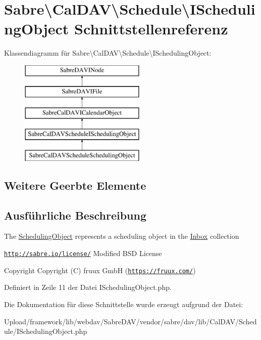 \hypertarget{interface_sabre_1_1_cal_d_a_v_1_1_schedule_1_1_i_scheduling_object}{}\section{Sabre\textbackslash{}Cal\+D\+AV\textbackslash{}Schedule\textbackslash{}I\+Scheduling\+Object Schnittstellenreferenz}
\label{interface_sabre_1_1_cal_d_a_v_1_1_schedule_1_1_i_scheduling_object}
Klassendiagramm für Sabre\textbackslash{}Cal\+D\+AV\textbackslash{}Schedule\textbackslash{}I\+Scheduling\+Object\+:\begin{figure}[H]
\begin{center}
\leavevmode
\includegraphics[height=5.000000cm]{interface_sabre_1_1_cal_d_a_v_1_1_schedule_1_1_i_scheduling_object}
\end{center}
\end{figure}
\subsection*{Weitere Geerbte Elemente}


\subsection{Ausführliche Beschreibung}
The \mbox{\hyperlink{class_sabre_1_1_cal_d_a_v_1_1_schedule_1_1_scheduling_object}{Scheduling\+Object}} represents a scheduling object in the \mbox{\hyperlink{class_sabre_1_1_cal_d_a_v_1_1_schedule_1_1_inbox}{Inbox}} collection

\href{http://sabre.io/license/}{\tt http\+://sabre.\+io/license/} Modified B\+SD License \begin{DoxyCopyright}{Copyright}
Copyright (C) fruux GmbH (\href{https://fruux.com/}{\tt https\+://fruux.\+com/}) 
\end{DoxyCopyright}


Definiert in Zeile 11 der Datei I\+Scheduling\+Object.\+php.



Die Dokumentation für diese Schnittstelle wurde erzeugt aufgrund der Datei\+:\begin{DoxyCompactItemize}
\item 
Upload/framework/lib/webdav/\+Sabre\+D\+A\+V/vendor/sabre/dav/lib/\+Cal\+D\+A\+V/\+Schedule/I\+Scheduling\+Object.\+php\end{DoxyCompactItemize}
